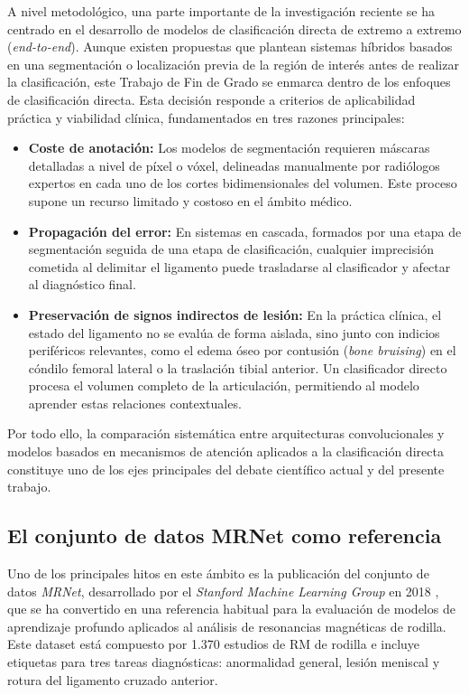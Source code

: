 A nivel metodológico, una parte importante de la investigación reciente se ha centrado en el desarrollo de modelos de clasificación directa de extremo a extremo (\textit{end-to-end}). Aunque existen propuestas que plantean sistemas híbridos basados en una segmentación o localización previa de la región de interés antes de realizar la clasificación, este Trabajo de Fin de Grado se enmarca dentro de los enfoques de clasificación directa. Esta decisión responde a criterios de aplicabilidad práctica y viabilidad clínica, fundamentados en tres razones principales:

\begin{itemize}
    \item \textbf{Coste de anotación:} Los modelos de segmentación requieren máscaras detalladas a nivel de píxel o vóxel, delineadas manualmente por radiólogos expertos en cada uno de los cortes bidimensionales del volumen. Este proceso supone un recurso limitado y costoso en el ámbito médico.
    \item \textbf{Propagación del error:} En sistemas en cascada, formados por una etapa de segmentación seguida de una etapa de clasificación, cualquier imprecisión cometida al delimitar el ligamento puede trasladarse al clasificador y afectar al diagnóstico final.
    \item \textbf{Preservación de signos indirectos de lesión:} En la práctica clínica, el estado del ligamento no se evalúa de forma aislada, sino junto con indicios periféricos relevantes, como el edema óseo por contusión (\textit{bone bruising}) en el cóndilo femoral lateral o la traslación tibial anterior. Un clasificador directo procesa el volumen completo de la articulación, permitiendo al modelo aprender estas relaciones contextuales.
\end{itemize}

Por todo ello, la comparación sistemática entre arquitecturas convolucionales y modelos basados en mecanismos de atención aplicados a la clasificación directa constituye uno de los ejes principales del debate científico actual y del presente trabajo.

\subsection{El conjunto de datos MRNet como referencia}

Uno de los principales hitos en este ámbito es la publicación del conjunto de datos \textit{MRNet}, desarrollado por el \textit{Stanford Machine Learning Group} en 2018 \cite{bien2018deep}, que se ha convertido en una referencia habitual para la evaluación de modelos de aprendizaje profundo aplicados al análisis de resonancias magnéticas de rodilla. Este dataset está compuesto por 1.370 estudios de RM de rodilla e incluye etiquetas para tres tareas diagnósticas: anormalidad general, lesión meniscal y rotura del ligamento cruzado anterior.

